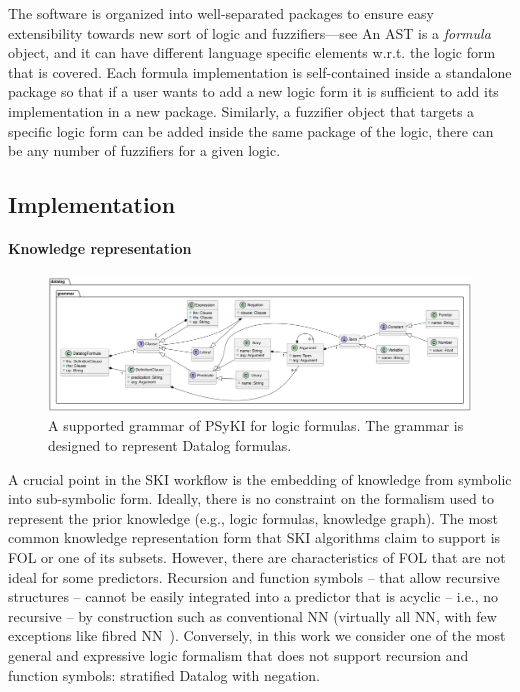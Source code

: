 The software is organized into well-separated packages to ensure easy extensibility towards new sort of logic and fuzzifiers---see 
%
An \gls{AST} is a \emph{formula} object, and it can have different language specific elements w.r.t. the logic form that is covered.
%
Each formula implementation is self-contained inside a standalone package so that if a user wants to add a new logic form it is sufficient to add its implementation in a new package.
%
Similarly, a fuzzifier object that targets a specific logic form can be added inside the same package of the logic, there can be any number of fuzzifiers for a given logic.


\subsection{Implementation}\label{subsec:psyki-implementation}
%
\paragraph{Knowledge representation}\label{par:knowledge-representation}
%
\begin{figure}
    \centering
    \includegraphics[width=\textwidth]{figures/grammar}
    \caption[Class diagram for the representation of Datalog formulas]{
        A supported grammar of \Gls{PSyKI} for logic formulas.
        The grammar is designed to represent Datalog formulas.
    }
    \label{fig:grammar}
\end{figure}
%
A crucial point in the \gls{SKI} workflow is the embedding of knowledge from symbolic into sub-symbolic form.
%
Ideally, there is no constraint on the formalism used to represent the prior knowledge (e.g., logic formulas, knowledge graph).
%
The most common knowledge representation form that \gls{SKI} algorithms claim to support is \gls{FOL} or one of its subsets.
%
However, there are characteristics of \gls{FOL} that are not ideal for some predictors.
%
Recursion and function symbols -- that allow recursive structures -- cannot be easily integrated into a predictor that is acyclic -- i.e., no recursive -- by construction such as conventional \gls{NN} (virtually all \gls{NN}, with few exceptions like fibred \gls{NN}~\cite{DBLP:conf/flairs/BaderGH05}).
%
Conversely, in this work we consider one of the most general and expressive logic formalism that does not support recursion and function symbols: stratified Datalog with negation.


